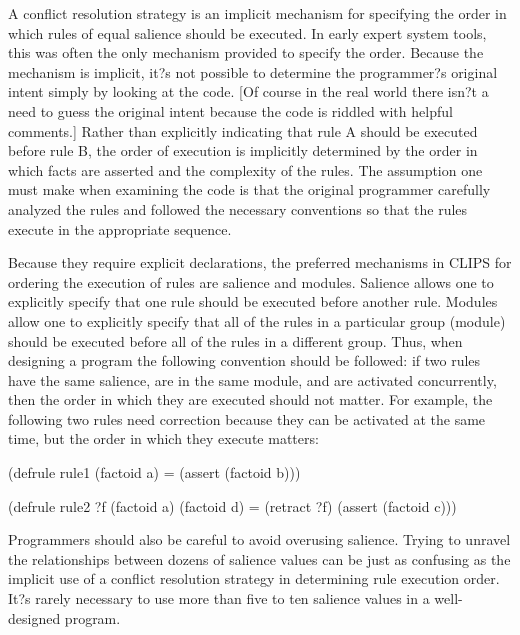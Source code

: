 \documentclass[letterpaper,10pt,english]{sphinxmanual}
\begin{document}
A conflict resolution strategy is an implicit mechanism for specifying
the order in which rules of equal salience should be executed. In early
expert system tools, this was often the only mechanism provided to
specify the order. Because the mechanism is implicit, it?s not possible
to determine the programmer?s original intent simply by looking at the
code. {[}Of course in the real world there isn?t a need to guess the
original intent because the code is riddled with helpful comments.{]}
Rather than explicitly indicating that rule A should be executed before
rule B, the order of execution is implicitly determined by the order in
which facts are asserted and the complexity of the rules. The assumption
one must make when examining the code is that the original programmer
carefully analyzed the rules and followed the necessary conventions so
that the rules execute in the appropriate sequence.

Because they require explicit declarations, the preferred mechanisms in
CLIPS for ordering the execution of rules are salience and modules.
Salience allows one to explicitly specify that one rule should be
executed before another rule. Modules allow one to explicitly specify
that all of the rules in a particular group (module) should be executed
before all of the rules in a different group. Thus, when designing a
program the following convention should be followed: if two rules have
the same salience, are in the same module, and are activated
concurrently, then the order in which they are executed should not
matter. For example, the following two rules need correction because
they can be activated at the same time, but the order in which they
execute matters:

\begin{sphinxVerbatim}[commandchars=\\\{\}]
(defrule rule\PYGZhy{}1
  (factoid a)
  =\PYGZgt{}
  (assert (factoid b)))

(defrule rule\PYGZhy{}2
  ?f \PYGZlt{}\PYGZhy{} (factoid a)
  (factoid d)
  =\PYGZgt{}
  (retract ?f)
  (assert (factoid c)))
\end{sphinxVerbatim}

Programmers should also be careful to avoid overusing salience. Trying
to unravel the relationships between dozens of salience values can be
just as confusing as the implicit use of a conflict resolution strategy
in determining rule execution order. It?s rarely necessary to use more
than five to ten salience values in a well-designed program.
\end{document}
